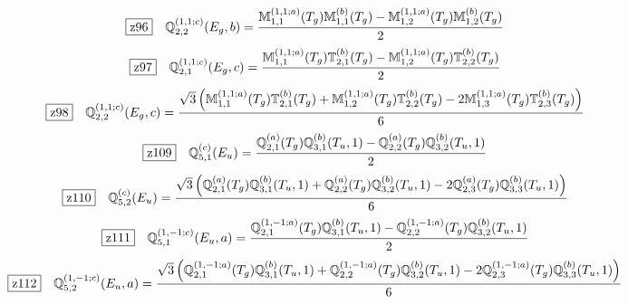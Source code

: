 \documentclass[fleqn,10pt,landscape]{jsarticle}
\begin{document}
\begin{dmath*}
\hspace*{3mm}\fbox{z96}\quad \mathbb{Q}_{2,2}^{(1,1;c)}(E_{g},b)=\frac{\mathbb{M}_{1,1}^{(1,1;a)}(T_{g}) \mathbb{M}_{1,1}^{(b)}(T_{g}) - \mathbb{M}_{1,2}^{(1,1;a)}(T_{g}) \mathbb{M}_{1,2}^{(b)}(T_{g})}{2}
\end{dmath*}
\begin{dmath*}
\hspace*{3mm}\fbox{z97}\quad \mathbb{Q}_{2,1}^{(1,1;c)}(E_{g},c)=\frac{\mathbb{M}_{1,1}^{(1,1;a)}(T_{g}) \mathbb{T}_{2,1}^{(b)}(T_{g}) - \mathbb{M}_{1,2}^{(1,1;a)}(T_{g}) \mathbb{T}_{2,2}^{(b)}(T_{g})}{2}
\end{dmath*}
\begin{dmath*}
\hspace*{3mm}\fbox{z98}\quad \mathbb{Q}_{2,2}^{(1,1;c)}(E_{g},c)=\frac{\sqrt{3} \left(\mathbb{M}_{1,1}^{(1,1;a)}(T_{g}) \mathbb{T}_{2,1}^{(b)}(T_{g}) + \mathbb{M}_{1,2}^{(1,1;a)}(T_{g}) \mathbb{T}_{2,2}^{(b)}(T_{g}) - 2 \mathbb{M}_{1,3}^{(1,1;a)}(T_{g}) \mathbb{T}_{2,3}^{(b)}(T_{g})\right)}{6}
\end{dmath*}
\begin{dmath*}
\hspace*{3mm}\fbox{z109}\quad \mathbb{Q}_{5,1}^{(c)}(E_{u})=\frac{\mathbb{Q}_{2,1}^{(a)}(T_{g}) \mathbb{Q}_{3,1}^{(b)}(T_{u},1) - \mathbb{Q}_{2,2}^{(a)}(T_{g}) \mathbb{Q}_{3,2}^{(b)}(T_{u},1)}{2}
\end{dmath*}
\begin{dmath*}
\hspace*{3mm}\fbox{z110}\quad \mathbb{Q}_{5,2}^{(c)}(E_{u})=\frac{\sqrt{3} \left(\mathbb{Q}_{2,1}^{(a)}(T_{g}) \mathbb{Q}_{3,1}^{(b)}(T_{u},1) + \mathbb{Q}_{2,2}^{(a)}(T_{g}) \mathbb{Q}_{3,2}^{(b)}(T_{u},1) - 2 \mathbb{Q}_{2,3}^{(a)}(T_{g}) \mathbb{Q}_{3,3}^{(b)}(T_{u},1)\right)}{6}
\end{dmath*}
\begin{dmath*}
\hspace*{3mm}\fbox{z111}\quad \mathbb{Q}_{5,1}^{(1,-1;c)}(E_{u},a)=\frac{\mathbb{Q}_{2,1}^{(1,-1;a)}(T_{g}) \mathbb{Q}_{3,1}^{(b)}(T_{u},1) - \mathbb{Q}_{2,2}^{(1,-1;a)}(T_{g}) \mathbb{Q}_{3,2}^{(b)}(T_{u},1)}{2}
\end{dmath*}
\begin{dmath*}
\hspace*{3mm}\fbox{z112}\quad \mathbb{Q}_{5,2}^{(1,-1;c)}(E_{u},a)=\frac{\sqrt{3} \left(\mathbb{Q}_{2,1}^{(1,-1;a)}(T_{g}) \mathbb{Q}_{3,1}^{(b)}(T_{u},1) + \mathbb{Q}_{2,2}^{(1,-1;a)}(T_{g}) \mathbb{Q}_{3,2}^{(b)}(T_{u},1) - 2 \mathbb{Q}_{2,3}^{(1,-1;a)}(T_{g}) \mathbb{Q}_{3,3}^{(b)}(T_{u},1)\right)}{6}
\end{dmath*}
\end{document}
